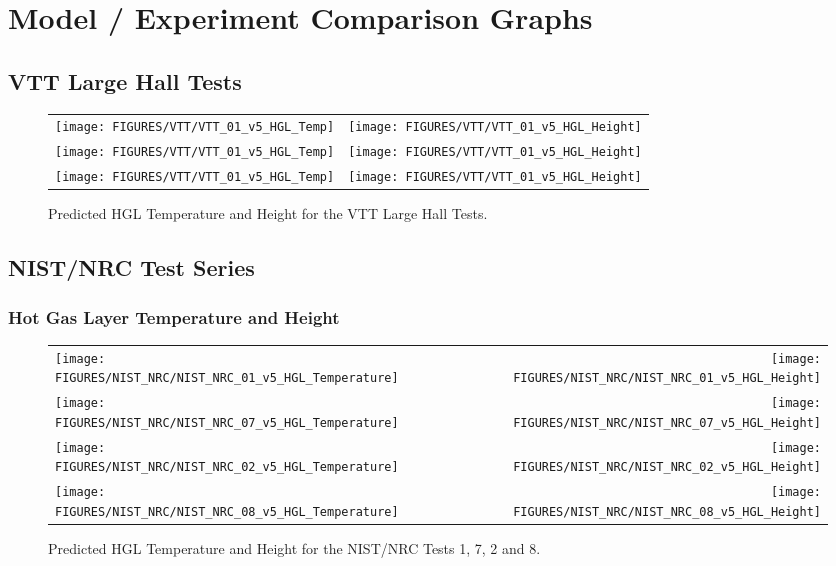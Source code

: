 \chapter{Model / Experiment Comparison Graphs}\label{sec:Graphs}

\section{VTT Large Hall Tests} \label{sec:VTT_Graphs}

\begin{figure}[p]
\begin{tabular*}{\textwidth}{l@{\extracolsep{\fill}}r}
\texttt{[image: FIGURES/VTT/VTT\_01\_v5\_HGL\_Temp]} &
\texttt{[image: FIGURES/VTT/VTT\_01\_v5\_HGL\_Height]} \\
\texttt{[image: FIGURES/VTT/VTT\_01\_v5\_HGL\_Temp]} &
\texttt{[image: FIGURES/VTT/VTT\_01\_v5\_HGL\_Height]} \\
\texttt{[image: FIGURES/VTT/VTT\_01\_v5\_HGL\_Temp]} &
\texttt{[image: FIGURES/VTT/VTT\_01\_v5\_HGL\_Height]}
\end{tabular*}
\caption{Predicted HGL Temperature and Height for the VTT Large Hall Tests.} \label{fig:VTT_HGL}
\end{figure}

\clearpage

\section{NIST/NRC Test Series}\label{sec:NIST_NRC_Graphs}

\subsection{Hot Gas Layer Temperature and Height}

\begin{figure}[p]
\begin{tabular*}{\textwidth}{l@{\extracolsep{\fill}}r}
\texttt{[image: FIGURES/NIST\_NRC/NIST\_NRC\_01\_v5\_HGL\_Temperature]} &
\texttt{[image: FIGURES/NIST\_NRC/NIST\_NRC\_01\_v5\_HGL\_Height]} \\
\texttt{[image: FIGURES/NIST\_NRC/NIST\_NRC\_07\_v5\_HGL\_Temperature]} &
\texttt{[image: FIGURES/NIST\_NRC/NIST\_NRC\_07\_v5\_HGL\_Height]} \\
\texttt{[image: FIGURES/NIST\_NRC/NIST\_NRC\_02\_v5\_HGL\_Temperature]} &
\texttt{[image: FIGURES/NIST\_NRC/NIST\_NRC\_02\_v5\_HGL\_Height]} \\
\texttt{[image: FIGURES/NIST\_NRC/NIST\_NRC\_08\_v5\_HGL\_Temperature]} &
\texttt{[image: FIGURES/NIST\_NRC/NIST\_NRC\_08\_v5\_HGL\_Height]}
\end{tabular*}
\caption{Predicted HGL Temperature and Height for the NIST/NRC Tests 1, 7, 2 and 8.} \label{NIST_NRC_HGL_Closed_1}
\end{figure}

